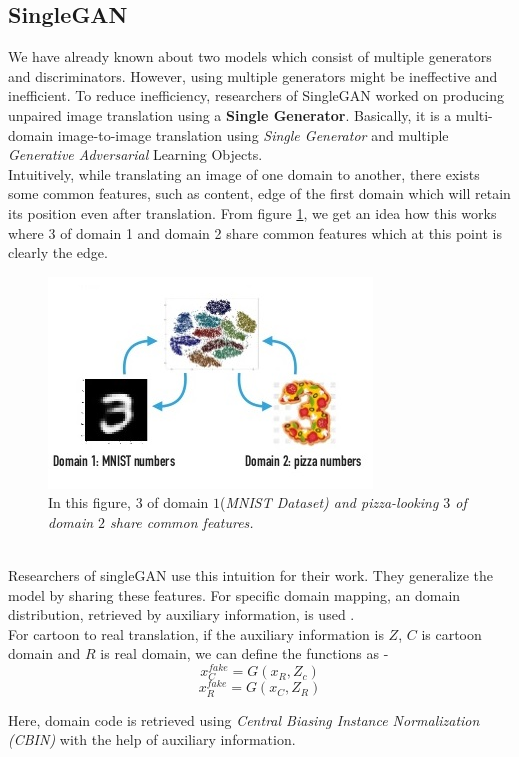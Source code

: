 \subsection{SingleGAN}
We have already known about two models which consist of multiple generators and discriminators. However, using multiple generators might be ineffective and inefficient. To reduce inefficiency, researchers of SingleGAN \cite{SingleGAN} worked on producing unpaired image translation using a \textbf{Single Generator}. Basically, it is a multi-domain image-to-image translation using \textit{Single Generator} and multiple \textit{Generative Adversarial}  Learning Objects. \\

Intuitively, while translating an image of one domain to another, there exists some common features, such as content, edge of the first domain which will retain its position even after translation. From figure \ref{fig: common}, we get an idea how this works where $3$ of domain 1 and domain 2 share common features which at this point is clearly the edge.
\begin{figure}[!htp] 
\centering
    \includegraphics[scale = 1.3]{shared_domain_singleGAN.jpg}
    \caption{In this figure, $3$ of domain $1$(\textit{MNIST Dataset) and pizza-looking $3$ of domain $2$ share common features.}}
\label{fig: common}
\end{figure}
\\
Researchers of singleGAN use this intuition for their work. They generalize the model by sharing these features. For specific domain mapping, an domain distribution, retrieved by auxiliary information, is used . \\
For cartoon to real translation, if the auxiliary information is $Z$, $C$ is cartoon domain and $R$ is real domain, we can define the functions as - 
$$x_C^{fake} = G(x_R, Z_c)$$
$$x_R^{fake} = G(x_C, Z_R)$$

Here, domain code is retrieved using \textit{Central Biasing
Instance Normalization (CBIN)}\cite{chen2016infogan} with the help of auxiliary information.

